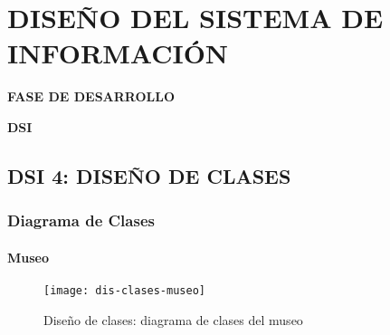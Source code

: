 \newpage
\chapter{DISEÑO DEL SISTEMA DE INFORMACIÓN}
	\vspace{2cm}	
	\begin{center}
	{\Large \textbf{FASE DE DESARROLLO} \par}
	\end{center}
	\vspace{5cm}
	
	\begin{center}
	\Huge \textbf{DSI}\par
	\end{center}


%
%
%
%
% 
%
%


\newpage
\section{DSI 4: DISEÑO DE CLASES}
\subsection{Diagrama de Clases}
\subsubsection{Museo}
\begin{figure}[H]
\centering
\centerline{\texttt{[image: dis-clases-museo]}}
\caption{Diseño de clases: diagrama de clases del museo}
\end{figure}
